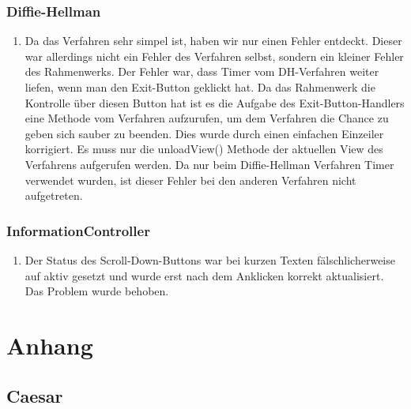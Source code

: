 \documentclass{article}
\begin{document}
     \subsubsection{Diffie-Hellman}
     \begin{enumerate}
         \item Da das Verfahren sehr simpel ist, haben wir nur einen Fehler entdeckt.
             Dieser war allerdings nicht ein Fehler des Verfahren selbst, sondern
             ein kleiner Fehler des Rahmenwerks. Der Fehler war, dass Timer vom DH-Verfahren weiter liefen,
             wenn man den Exit-Button geklickt hat. Da das Rahmenwerk die Kontrolle über diesen Button
             hat ist es die Aufgabe des Exit-Button-Handlers eine Methode vom Verfahren aufzurufen,
             um dem Verfahren die Chance zu geben sich sauber zu beenden. Dies wurde
             durch einen einfachen Einzeiler korrigiert. Es muss nur die unloadView() Methode der aktuellen
             View des Verfahrens aufgerufen werden.
             Da nur beim Diffie-Hellman Verfahren Timer verwendet wurden, ist dieser
             Fehler bei den anderen Verfahren nicht aufgetreten.
         \end{enumerate}

    \subsubsection{InformationController}
     \begin{enumerate}
         \item Der Status des Scroll-Down-Buttons war bei kurzen Texten fälschlicherweise auf aktiv gesetzt
         und wurde erst nach dem Anklicken korrekt aktualisiert. Das Problem wurde behoben.
         \end{enumerate}


\section{Anhang}
	 \subsection{Caesar}
\end{document}
